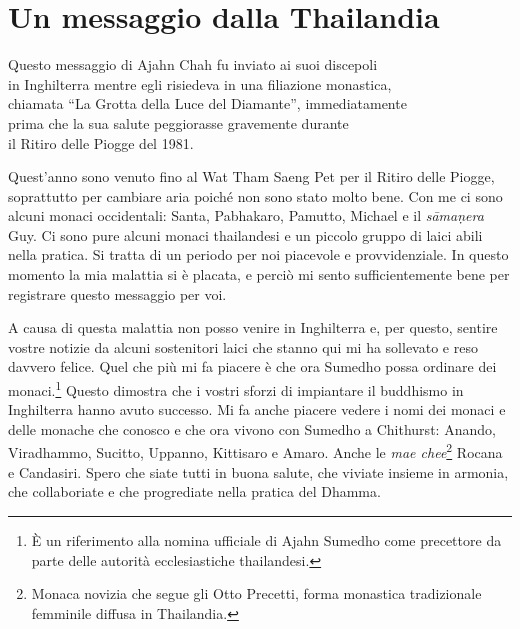\chapter{Un messaggio dalla Thailandia}

\begin{openingQuote}
  \centering

  Questo messaggio di Ajahn Chah fu inviato ai suoi discepoli\\
  in Inghilterra mentre egli risiedeva in una filiazione monastica,\\
  chiamata ``La Grotta della Luce del Diamante'', immediatamente\\
  prima che la sua salute peggiorasse gravemente durante\\
  il Ritiro delle Piogge del 1981.
\end{openingQuote}

Quest'anno sono venuto fino al Wat Tham Saeng Pet per il Ritiro delle
Piogge, soprattutto per cambiare aria poiché non sono stato molto bene.
Con me ci sono alcuni monaci occidentali: Santa, Pabhakaro, Pamutto,
Michael e il \emph{sāmaṇera} Guy. Ci sono pure alcuni monaci thailandesi
e un piccolo gruppo di laici abili nella pratica. Si tratta di un
periodo per noi piacevole e provvidenziale. In questo momento la mia
malattia si è placata, e perciò mi sento sufficientemente bene per
registrare questo messaggio per voi.

A causa di questa malattia non posso venire in Inghilterra e, per
questo, sentire vostre notizie da alcuni sostenitori laici che stanno
qui mi ha sollevato e reso davvero felice. Quel che più mi fa piacere è
che ora Sumedho possa ordinare dei monaci.\footnote{È un riferimento alla
  nomina ufficiale di Ajahn Sumedho come precettore da parte delle
  autorità ecclesiastiche thailandesi.} Questo dimostra che i vostri
sforzi di impiantare il buddhismo in Inghilterra hanno avuto successo.
Mi fa anche piacere vedere i nomi dei monaci e delle monache che conosco
e che ora vivono con Sumedho a Chithurst: Anando, Viradhammo, Sucitto,
Uppanno, Kittisaro e Amaro. Anche le \emph{mae chee}\footnote{Monaca
  novizia che segue gli Otto Precetti, forma monastica tradizionale
  femminile diffusa in Thailandia.} Rocana e Candasiri. Spero che siate
tutti in buona salute, che viviate insieme in armonia, che collaboriate
e che progrediate nella pratica del Dhamma.

